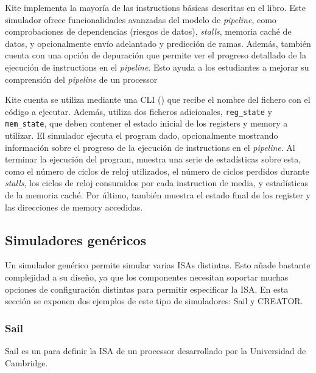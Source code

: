 Kite implementa la mayoría de las \glspl{instruction} básicas descritas en el
libro. Este simulador ofrece funcionalidades avanzadas del modelo de
\textit{pipeline}, como comprobaciones de dependencias (riesgos de datos),
\textit{stalls}, memoria caché de datos, y opcionalmente envío adelantado y
predicción de ramas. Además, también cuenta con una opción de depuración que
permite ver el progreso detallado de la ejecución de \glspl{instruction} en el
\textit{pipeline}. Esto ayuda a los estudiantes a mejorar su comprensión del
\textit{pipeline} de un \gls{processor}

Kite cuenta se utiliza mediante una \gls{CLI} () que recibe el
nombre del fichero con el código  a ejecutar.
Además, utiliza dos ficheros adicionales, \verb!reg_state! y \verb!mem_state!,
que deben contener el estado inicial de los \glspl{register} y \gls{memory} a
utilizar. El simulador ejecuta el \gls{program} dado, opcionalmente mostrando
información sobre el progreso de la ejecución de \glspl{instruction} en el
\textit{pipeline}. Al terminar la ejecución del \gls{program}, muestra una serie
de estadísticas sobre esta, como el número de ciclos de reloj utilizados, el
número de ciclos perdidos durante \textit{stalls}, los ciclos de reloj
consumidos por cada \gls{instruction} de media, y estadísticas de la memoria
caché. Por último, también muestra el estado final de los \gls{register} y las
direcciones de \gls{memory} accedidas.


\FloatBarrier

\subsection{Simuladores genéricos}

Un simulador genérico permite simular varias \glspl{ISA} distintas. Esto añade
bastante complejidad a su diseño, ya que los componentes necesitan soportar
muchas opciones de configuración distintas para permitir especificar la
\gls{ISA}. En esta sección se exponen dos ejemplos de este tipo de simuladores:
Sail y CREATOR.

\subsubsection{Sail}

Sail \parencite{sail} es un  para
definir la \gls{ISA} de un \gls{processor} desarrollado por la Universidad de
Cambridge.

